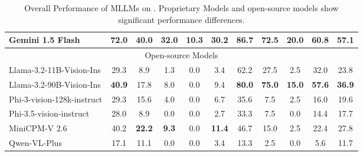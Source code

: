\begin{table*}[t]
{\begin{tabular}{lcccccccccc}
\multicolumn{1}{l|}{Gemini 1.5 Flash\cite{geminiteam2024gemini15unlockingmultimodal}}           & \multicolumn{1}{c|}{72.0}                         & 40.0 & 32.0   & 10.3 & \multicolumn{1}{c|}{30.2}    & 86.7  & 72.5   & 20.0 & \multicolumn{1}{c|}{60.8}    & 57.1                  \\ \hline
\multicolumn{11}{c}{Open-source Models}                                                                                                                                                                                                  \\ \hline
\multicolumn{1}{l|}{Llama-3.2-11B-Vision-Ins\cite{Llama3.2}}   & \multicolumn{1}{c|}{29.3}                         & 8.9  & 1.3    & 0.0  & \multicolumn{1}{c|}{3.4}     & 62.2  & 27.5   & 2.5  & \multicolumn{1}{c|}{32.0}    & 23.8                  \\
\multicolumn{1}{l|}{Llama-3.2-90B-Vision-Ins\cite{Llama3.2}}   & \multicolumn{1}{c|}{\textbf{40.9}}                & 17.8 & 8.0    & 0.0  & \multicolumn{1}{c|}{9.4}     & \textbf{80.0}  & \textbf{75.0}   & \textbf{15.0} & \multicolumn{1}{c|}{\textbf{57.6}}    & \textbf{36.9}                 \\
\multicolumn{1}{l|}{Phi-3-vision-128k-instruct\cite{abdin2024phi3technicalreporthighly}} & \multicolumn{1}{c|}{29.3}                         & 15.6 & 4.0    & 0.0  & \multicolumn{1}{c|}{6.7}     & 35.6  & 7.5    & 2.5  & \multicolumn{1}{c|}{16.0}    & 19.6                  \\
\multicolumn{1}{l|}{Phi-3.5-vision-instruct\cite{abdin2024phi3technicalreporthighly}}    & \multicolumn{1}{c|}{28.0}                         & 8.9  & 0.0    & 0.0  & \multicolumn{1}{c|}{2.7}     & 33.3  & 7.5    & 0.0  & \multicolumn{1}{c|}{14.4}    & 17.7                  \\
\multicolumn{1}{l|}{MiniCPM-V 2.6\cite{yao2024minicpm}}              & \multicolumn{1}{c|}{40.2}                         & \textbf{22.2} & \textbf{9.3}    & 0.0  & \multicolumn{1}{c|}{\textbf{11.4}}    & 46.7  & 15.0   & 2.5  & \multicolumn{1}{c|}{22.4}    & 27.8                  \\
\multicolumn{1}{l|}{Qwen-VL-Plus\cite{bai2023qwenvlversatilevisionlanguagemodel}}               & \multicolumn{1}{c|}{17.1}                         & 11.1 & 0.0    & 0.0  & \multicolumn{1}{c|}{3.4}     & 13.3  & 2.5    & 0.0  & \multicolumn{1}{c|}{5.6}     & 11.7                  \\ \hline
\end{tabular}
}
\caption{Overall Performance of MLLMs on \benchmark. Proprietary Models and open-source models show significant performance differences.}
\label{tab: overall}
\end{table*}